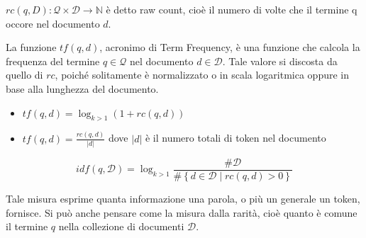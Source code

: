\begin{definizione}\label{def:raw_count}
	$rc(q, D) : \mathcal{Q} \times \mathcal{D} \rightarrow \mathbb{N}$ è detto raw count, cioè il numero di volte che
	il termine q occore nel documento $d$.
\end{definizione}

\begin{definizione}\label{def:}
	La funzione $tf(q,d)$, acronimo di Term Frequency, è una funzione che calcola la frequenza del
	termine $q \in \mathcal{Q}$ nel documento $d \in \mathcal{D}$.
	Tale valore si discosta da quello di $rc$, poiché solitamente è normalizzato o in scala logaritmica
	oppure in base alla lunghezza del documento.
	
	\begin{itemize}
		\item $tf(q,d) = \log_{k>1}(1+rc(q,d))$
		\item $tf(q,d) = \frac{rc(q,d)}{|d|}$ dove $|d|$ è il numero totali di token nel documento
	\end{itemize}
\end{definizione}

\begin{definizione}\label{def:idf}
	$$
	idf(q, \mathcal{D}) = \log_{k>1}{
		\frac{\#\mathcal{D}}{
			\#
			\left\{
			d \in \mathcal{D} \middle \lvert rc(q,d) > 0
			\right\} 
		}
	}
	$$
	
	Tale misura esprime quanta informazione una parola, o più un generale un token, fornisce.
	Si può anche pensare come la misura dalla rarità, cioè quanto è comune il termine $q$
	nella collezione di documenti $\mathcal{D}$.
\end{definizione}




